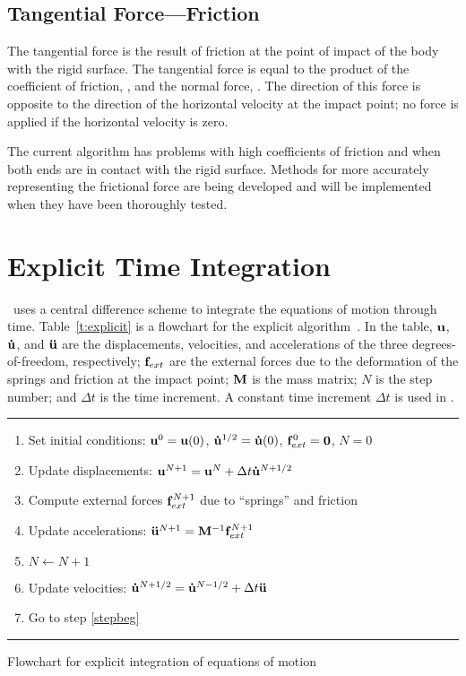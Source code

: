 \subsection{Tangential Force---Friction}

The tangential force is the result of friction at the point of impact of
the body with the rigid surface.  The tangential force is equal to the
product of the coefficient of friction, , and the normal force,
.  The direction of this force is opposite to the direction of
the horizontal velocity at the impact point; no force is applied if the
horizontal velocity is zero.

The current algorithm has problems with high coefficients of friction
and when both ends are in contact with the rigid surface. Methods for
more accurately representing the frictional force are being developed
and will be implemented when they have been thoroughly tested.

\section{Explicit Time Integration}
\SLAP\ uses a central difference scheme to integrate the equations of
motion through time. Table~\ref{t:explicit} is a flowchart for the
explicit algorithm~\cite{Belyt}.  In the table, ${\bf u}$, ${\bf \dot u}$, and
${\bf \ddot u}$ are the displacements, velocities, and accelerations of the
three degrees-of-freedom, respectively; ${\bf f}_{ext}$ are the external
forces due to the deformation of the springs and friction at the
impact point; ${\bf M}$ is the mass matrix; $N$ is the step number;
and $\Delta t$ is the time increment.  A constant time increment
$\Delta t$ is used in \SLAP.

\begin{table}[ht]
\begingroup\itemsep 0pt
\hrule
\begin{enumerate}
\item Set initial conditions: ${\bf u}^0 = {\bf u}(0)$, ${\bf \dot u}^{1/2}
= {\bf \dot u}(0)$, ${\bf f}_{ext}^0 = {\bf 0}$, $N=0$
\item\label{stepbeg} Update displacements: ${\bf u}^{N+1} = {\bf u}^N + \Delta
t{\bf \dot u}^{N+1/2}$
\item Compute external forces ${\bf f}_{ext}^{N+1}$ due to ``springs'' and
friction
\item Update accelerations: ${\bf \ddot u}^{N+1} = {\bf M}^{-1} {\bf f}_{ext}^{N+1}$
\item $N \leftarrow N+1$
\item Update velocities: ${\bf \dot u}^{N+1/2} = {\bf \dot u}^{N-1/2} + \Delta t{\bf \ddot u}$
\item Go to step \ref{stepbeg}
\end{enumerate}
\hrule
\endgroup
\caption{Flowchart for explicit integration of equations of
motion}\label{t:explicit}
\end{table}

